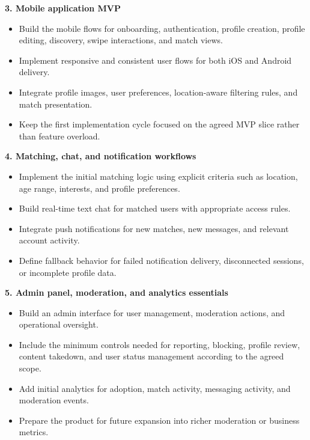 \documentclass[11pt,a4paper]{article}
\begin{document}
\textbf{3. Mobile application MVP}\par

\begin{itemize}
\item Build the mobile flows for onboarding, authentication, profile creation, profile editing, discovery, swipe interactions, and match views.
\item Implement responsive and consistent user flows for both iOS and Android delivery.
\item Integrate profile images, user preferences, location-aware filtering rules, and match presentation.
\item Keep the first implementation cycle focused on the agreed MVP slice rather than feature overload.
\end{itemize}

\textbf{4. Matching, chat, and notification workflows}\par

\begin{itemize}
\item Implement the initial matching logic using explicit criteria such as location, age range, interests, and profile preferences.
\item Build real-time text chat for matched users with appropriate access rules.
\item Integrate push notifications for new matches, new messages, and relevant account activity.
\item Define fallback behavior for failed notification delivery, disconnected sessions, or incomplete profile data.
\end{itemize}

\textbf{5. Admin panel, moderation, and analytics essentials}\par

\begin{itemize}
\item Build an admin interface for user management, moderation actions, and operational oversight.
\item Include the minimum controls needed for reporting, blocking, profile review, content takedown, and user status management according to the agreed scope.
\item Add initial analytics for adoption, match activity, messaging activity, and moderation events.
\item Prepare the product for future expansion into richer moderation or business metrics.
\end{itemize}
\end{document}
